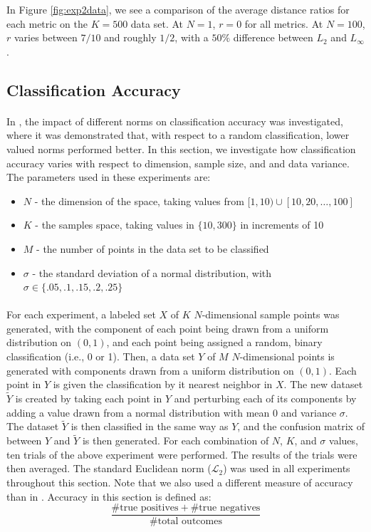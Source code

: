 \documentclass{article}
\begin{document}
In Figure \ref{fig:exp2data}, we see a comparison of the average distance ratios for each metric on the $K=500$ data set. At $N=1$, $r=0$ for all metrics. At $N=100$, $r$ varies between $7/10$ and roughly $1/2$, with a $50\%$ difference between $L_2$ and $L_{\infty}$.

\subsection{Classification Accuracy}
\paragraph{}
In \cite{aggarwal2001surprising}, the impact of different norms on classification accuracy was investigated, where it was demonstrated that, with respect to a random classification, lower valued norms performed better. In this section, we investigate how classification accuracy varies with respect to dimension, sample size, and and data variance. The parameters used in these experiments are:
\begin{itemize}
\item $N$ - the dimension of the space, taking values from $[1,10)\cup[10,20,\ldots,100]$
\item $K$ - the samples space, taking values in $\{10,300\}$ in increments of 10
\item $M$ - the number of points in the data set to be classified
\item $\sigma$ - the standard deviation of a normal distribution, with $\sigma\in\{.05,.1,.15,.2,.25\}$
\end{itemize}
\paragraph{}
For each experiment, a labeled set $X$ of $K$ $N$-dimensional sample points was generated, with the component of each point being drawn from a uniform distribution on $(0,1)$, and each point being assigned a random, binary classification (i.e., 0 or 1). Then, a data set $Y$ of $M$ $N$-dimensional points is generated with components drawn  from a uniform distribution on $(0,1)$. Each point in $Y$ is given the classification by it nearest neighbor in $X$. The new dataset $\tilde{Y}$ is created by taking each point in $Y$ and perturbing each of its components by adding a value drawn from a normal distribution with mean $0$ and variance $\sigma$. The dataset $\tilde{Y}$ is then classified in the same way as $Y$, and the confusion matrix of between $Y$ and $\tilde{Y}$ is then generated.
For each combination of $N$, $K$, and $\sigma$ values, ten trials of the above experiment were performed. The results of the trials were then averaged. The standard Euclidean norm ($\mathcal{L}_2$) was used in all experiments throughout this section. Note that we also used a different measure of accuracy than in \cite{aggarwal2001surprising}. Accuracy in this section is defined as:
$$
	\dfrac{\#\textrm{true positives}+\#\textrm{true negatives}}{\#\textrm{total outcomes}}
$$
\end{document}

